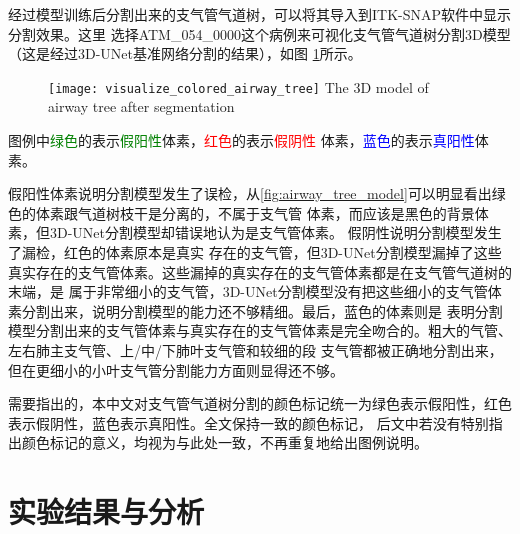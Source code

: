 经过模型训练后分割出来的支气管气道树，可以将其导入到ITK-SNAP\cite{Yushkevich2006ITKSNAP}软件中显示分割效果。这里
选择ATM\_054\_0000这个病例来可视化支气管气道树分割3D模型（这是经过3D-UNet基准网络分割的结果），如图
\ref{fig:airway_tree_model}所示。
\begin{figure}[ht]
    \centering
    \texttt{[image: visualize\_colored\_airway\_tree]}
        {The 3D model of airway tree after segmentation}
    \label{fig:airway_tree_model}
\end{figure}
图例中\textcolor{green}{绿色}的表示\textcolor{green}{假阳性}体素，\textcolor{red}{红色}的表示\textcolor{red}{假阴性}
体素，\textcolor{blue}{蓝色}的表示\textcolor{blue}{真阳性}体素。

假阳性体素说明分割模型发生了误检，从\autoref{fig:airway_tree_model}可以明显看出绿色的体素跟气道树枝干是分离的，不属于支气管
体素，而应该是黑色的背景体素，但3D-UNet分割模型却错误地认为是支气管体素。 假阴性说明分割模型发生了漏检，红色的体素原本是真实
存在的支气管，但3D-UNet分割模型漏掉了这些真实存在的支气管体素。这些漏掉的真实存在的支气管体素都是在支气管气道树的末端，是
属于非常细小的支气管，3D-UNet分割模型没有把这些细小的支气管体素分割出来，说明分割模型的能力还不够精细。最后，蓝色的体素则是
表明分割模型分割出来的支气管体素与真实存在的支气管体素是完全吻合的。粗大的气管、左右肺主支气管、上/中/下肺叶支气管和较细的段
支气管都被正确地分割出来，但在更细小的小叶支气管分割能力方面则显得还不够。

需要指出的，本中文对支气管气道树分割的颜色标记统一为绿色表示假阳性，红色表示假阴性，蓝色表示真阳性。全文保持一致的颜色标记，
后文中若没有特别指出颜色标记的意义，均视为与此处一致，不再重复地给出图例说明。

\section{实验结果与分析}\label{sec:baseline_experiment}
